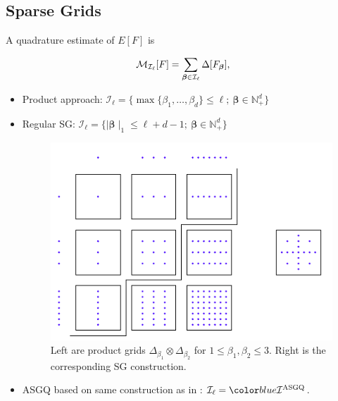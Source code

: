 \documentclass[ima, 20pt, portrait, plainboxedsections]{sciposter}
\begin{document}
\begin{multicols}{3}
%
%
\section*{Sparse Grids}
A quadrature estimate of $E[F]$ is
\begin{small}
\begin{equation}\label{eq:Quadrature_estimator}
\mathcal{M}_{\mathcal{I_{\ell}}}[F]=\sum_{\boldsymbol{\beta} \in \mathcal{I}_{\ell}} \Delta [F_{\boldsymbol{\beta}}],
\end{equation}
\end{small}
\begin{itemize}
\item Product approach: $\mathcal{I}_{\ell}=\{ \max\{\beta_1,\dots,\beta_d \} \le \ell;\: \boldsymbol{\beta} \in \mathbb{N}^d_{+} \} $
\item Regular SG: $ \mathcal{I}_{\ell}=\{  \mid \boldsymbol{\beta} \mid_1 \le \ell+d-1; \: \boldsymbol{\beta} \in \mathbb{N}^d_{+} \} $

		\begin{figure}
		\centering
		\includegraphics[scale=0.5]{sparse_grids}
		\vspace{0.1cm}
		\caption{Left are product grids $\Delta_{\beta_1} \otimes \Delta_{\beta_2}$ for $1 \le \beta_1, \beta_2 \le 3$. Right is the corresponding SG construction.}
		\label{fig:vol_rough}
	\end{figure}
	\vspace{0.3cm}
\item ASGQ based on same construction as in \cite{haji2016multi}: $\mathcal{I}_{\ell}=\blue{\mathcal{I}^{\text{ASGQ}}}$.
\end{itemize}

\end{multicols}
\end{document}
